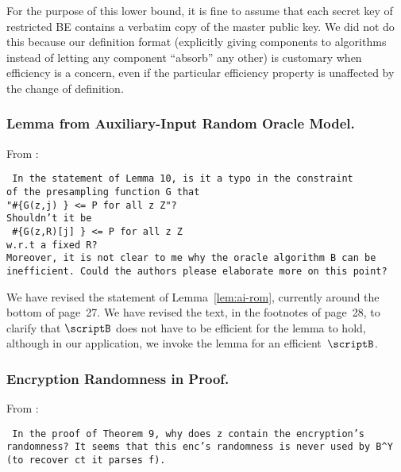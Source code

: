For the purpose of this lower bound,
it is fine to assume that each secret key of restricted BE
contains a verbatim copy of the master public key.
We did not do this because our definition format
(explicitly giving components to algorithms
instead of letting any component ``absorb'' any other)
is customary when efficiency is a concern,
even if the particular efficiency property is unaffected
by the change of definition.

\subsubsection{Lemma from Auxiliary-Input Random Oracle Model.}
From :

\texttt{
In the statement of Lemma 10, is it a typo in the constraint \\
of the presampling function G that \\
\hspace*{4em}"\#\{G(z,j) {\string\neq} {\string\bot}\} <= P for all z {\string\in} Z"? \\
Shouldn't it be \\
\hspace*{4em}\ \#\{G(z,R)[j] {\string\neq} {\string\bot}\} <= P for all z {\string\in} Z \\
\hspace*{18.5em}w.r.t a fixed R? \\
Moreover, it is not clear to me why the oracle algorithm B can be \\
inefficient. Could the authors please elaborate more on this point?%
}

We have revised the statement of Lemma~\ref{lem:ai-rom},
currently around the bottom of page~27.
We have revised the text, in the footnotes of page~28, to clarify
that $\scriptB$ does not have to be efficient for the lemma to hold,
although in our application, we invoke the lemma for an efficient~$\scriptB$.

\subsubsection{Encryption Randomness in Proof.}
From :

\texttt{
In the proof of Theorem 9, why does z contain the encryption's \\
randomness? It seems that this enc's randomness is never used by B\string^Y \\
(to recover ct it parses f).
}

